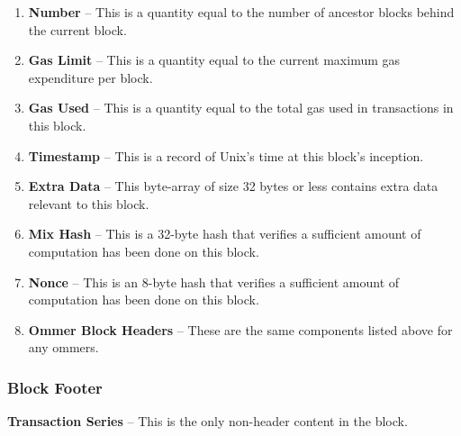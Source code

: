 \documentclass[10pt,letterpaper,leqno,bibliography=totoc]{scrartcl}
\newenvironment{alphafootnotes}
{\par\edef\savedfootnotenumber{\number\value{footnote}}
\renewcommand{\thefootnote}{\alph{footnote}}
\setcounter{footnote}{0}}
{\par\setcounter{footnote}{\savedfootnotenumber}}
\begin{document}
\begin{alphafootnotes}
\begin{multicols*}{2}
\begin{enumerate}
					\item \textbf{Number} -- This is a quantity equal to the number of ancestor blocks behind the current block.
					\item \textbf{Gas Limit} -- This is a quantity equal to the current maximum gas expenditure per block.
					\item \textbf{Gas Used} -- This is a quantity equal to the total gas used in transactions in this block.
					\item \textbf{Timestamp} -- This is a record of Unix's time at this block's inception.
					

					\item \textbf{Extra Data} -- This byte-array of size 32 bytes or less contains extra data relevant to this block.
					\item \textbf{Mix Hash} -- This is a 32-byte hash that verifies a sufficient amount of computation has been done on this block.
					\item \textbf{Nonce} -- This is an 8-byte hash that verifies a sufficient amount of computation has been done on this block.
					\item \textbf{Ommer Block Headers} -- These are the same components listed above for any ommers.
				

					\end{enumerate}
				
					\subsubsection{Block Footer}
					\item \textbf{Transaction Series} -- This is the only non-header content in the block.
					

\end{multicols*}
\end{alphafootnotes}
\end{document}
